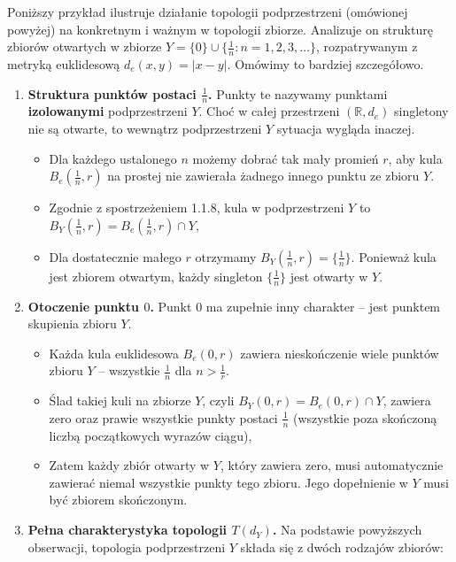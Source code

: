 Poniższy przykład ilustruje działanie topologii podprzestrzeni (omówionej powyżej) na konkretnym i ważnym w topologii zbiorze. Analizuje on strukturę zbiorów otwartych w zbiorze $Y = \{0\} \cup \{\frac{1}{n}: n = 1,2,3,\ldots\} $, rozpatrywanym z metryką euklidesową $d_{e}\left( x,y \right) = \left| x-y \right| $. Omówimy to bardziej szczegółowo.
\begin{enumerate}[label=\arabic*)]
	\item \textbf{Struktura punktów postaci $\frac{1}{n}$.} Punkty te nazywamy punktami \textbf{izolowanymi} podprzestrzeni $Y$. Choć w całej przestrzeni $\left( \mathbb{R}, d_{e} \right) $ singletony nie są otwarte, to wewnątrz podprzestrzeni $Y$ sytuacja wygląda inaczej.
		\begin{itemize}
			\item Dla każdego ustalonego $n$ możemy dobrać tak mały promień $r$, aby kula $B_{e}\left( \frac{1}{n}, r \right) $ na prostej nie zawierała żadnego innego punktu ze zbioru $Y$.
			\item Zgodnie z spostrzeżeniem 1.1.8, kula w podprzestrzeni $Y$ to $B_{Y}\left( \frac{1}{n}, r \right) = B_{e}\left( \frac{1}{n}, r \right) \cap Y$,
			\item Dla dostatecznie małego $r$ otrzymamy $B_{Y}\left( \frac{1}{n},r \right) = \{\frac{1}{n}\} $. Ponieważ kula jest zbiorem otwartym, każdy singleton $\{\frac{1}{n}\} $ jest otwarty w $Y$.
		\end{itemize}
	\item \textbf{Otoczenie punktu $0$.} Punkt $0$ ma zupełnie inny charakter -- jest punktem skupienia zbioru $Y$.
		\begin{itemize}
			\item Każda kula euklidesowa $B_{e}\left( 0,r \right)$ zawiera nieskończenie wiele punktów zbioru $Y$ -- wszystkie $\frac{1}{n}$ dla $n > \frac{1}{r}$.
			\item Ślad takiej kuli na zbiorze $Y$, czyli $B_{Y}\left( 0,r \right) = B_{e}\left( 0,r \right) \cap Y$, zawiera zero oraz prawie wszystkie punkty postaci $\frac{1}{n}$ (wszystkie poza skończoną liczbą początkowych wyrazów ciągu),
			\item Zatem każdy zbiór otwarty w $Y$, który zawiera zero, musi automatycznie zawierać niemal wszystkie punkty tego zbioru. Jego dopełnienie w $Y$ musi być zbiorem skończonym.
		\end{itemize}
	\item \textbf{Pełna charakterystyka topologii $T\left( d_{Y} \right) $.} Na podstawie powyższych obserwacji, topologia podprzestrzeni $Y$ składa się z dwóch rodzajów zbiorów:

\end{enumerate}
